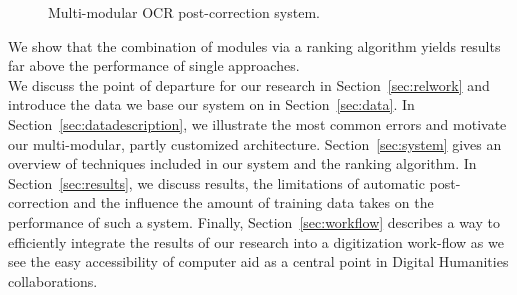 \documentclass[11pt,letterpaper]{article}
\begin{document}
\begin{figure*}


        \caption{Multi-modular OCR post-correction system.}
        \label{fig:OCRpost}
        
\end{figure*}

\noindent
We show that the combination of modules via a ranking algorithm yields results far above the performance of single approaches.\\
We discuss the point of departure for our research in Section~\ref{sec:relwork}
and introduce the data we base our system on in Section~\ref{sec:data}. In Section~\ref{sec:datadescription}, we 
illustrate the most common errors and motivate our multi-modular, partly customized architecture. Section~\ref{sec:system} gives an overview 
of techniques included in our system and the ranking algorithm. In Section~\ref{sec:results}, we discuss results, the limitations of automatic post-correction and the influence the amount of training data takes on the performance of such a system. Finally, Section~\ref{sec:workflow} describes a way to efficiently integrate
the results of our research into a digitization work-flow as we see the easy accessibility of 
computer aid as a central point in Digital Humanities collaborations.
\end{document}
